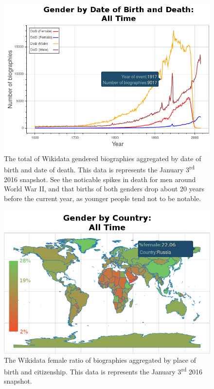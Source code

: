 \documentclass{sig-alternate-05-2015}
\begin{document}
\begin{figure}
\includegraphics[width=\columnwidth]{figures/genderbydob.png} 
\caption{The total of Wikidata gendered biographies aggregated by date of birth and date of death. This data is represents the January 3\textsuperscript{rd} 2016 snapshot. See the noticable spikes in death for men around World War II, and that births of both genders drop about 20 years before the current year, as younger people tend not to be notable.}
\label{fig:genderbydob}
\end{figure}

\begin{figure}
\includegraphics[width=\columnwidth]{figures/genderbycountry.png} 
\caption{The Wikidata female ratio of biographies aggregated by place of birth and citizenship. This data is represents the January 3\textsuperscript{rd} 2016 snapshot.}
\label{fig:genderbycountry}
\end{figure}
\end{document}
